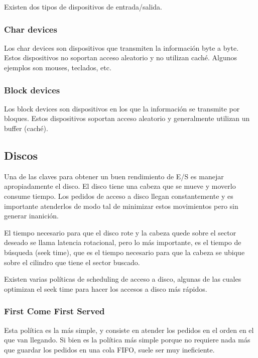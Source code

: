 \documentclass{article}
\begin{document}
Existen dos tipos de dispositivos de entrada/salida.

\subsubsection{Char devices}

Los char devices son dispositivos que transmiten la informaci\'on byte a byte. Estos dispositivos no soportan acceso aleatorio y no utilizan cach\'e. Algunos ejemplos son mouses, teclados, etc.

\subsubsection{Block devices}

Los block devices son dispositivos en los que la informaci\'on se transmite por bloques. Estos dispositivos soportan acceso aleatorio y generalmente utilizan un buffer (cach\'e).

\subsection{Discos}

Una de las claves para obtener un buen rendimiento de E/S es manejar apropiadamente el disco. El disco tiene una cabeza que se mueve y moverlo consume tiempo. Los pedidos de acceso a disco llegan constantemente y es importante atenderlos de modo tal de minimizar estos movimientos pero sin generar inanici\'on.

El tiempo necesario para que el disco rote y la cabeza quede sobre el sector deseado se llama latencia rotacional, pero lo m\'as importante, es el tiempo de b\'usqueda (seek time), que es el tiempo necesario para que la cabeza se ubique sobre el cilindro que tiene el sector buscado.

Existen varias pol\'iticas de scheduling de acceso a disco, algunas de las cuales optimizan el seek time para hacer los accesos a disco m\'as r\'apidos.

\subsubsection{First Come First Served}

Esta pol\'itica es la m\'as simple, y consiste en atender los pedidos en el orden en el que van llegando. Si bien es la pol\'itica m\'as simple porque no requiere nada m\'as que guardar los pedidos en una cola FIFO, suele ser muy ineficiente.
\end{document}
